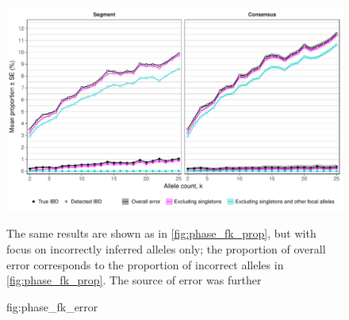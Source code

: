 

\begin{figure}[!htb]
\includegraphics[width=\textwidth]{./img/ch3/phase_fk_error}
{The same results are shown as in \cref{fig:phase_fk_prop}, but with focus on incorrectly inferred alleles only; \ie the proportion of overall error corresponds to the proportion of incorrect alleles in \cref{fig:phase_fk_prop}.
The source of error was further

}
{fig:phase_fk_error}
\end{figure}
